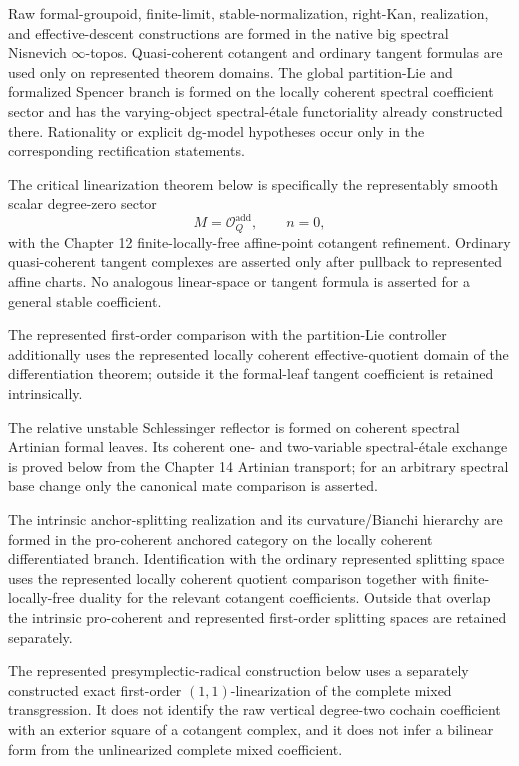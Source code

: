 \begin{convention}
\label{conv:symmetry-noether-theorem-domains}
Raw formal-groupoid, finite-limit, stable-normalization, right-Kan, realization,
and effective-descent constructions are formed in the native big spectral
Nisnevich $\infty$-topos.  Quasi-coherent cotangent and ordinary tangent formulas
are used only on represented theorem domains.  The global partition-Lie and
formalized Spencer branch is formed on the locally coherent spectral coefficient
sector and has the varying-object spectral-\'etale functoriality already
constructed there.  Rationality or explicit dg-model hypotheses occur only in the
corresponding rectification statements.

The critical linearization theorem below is specifically the representably smooth
scalar degree-zero sector
\[
M=\mathcal O_Q^{\mathrm{add}},\qquad n=0,
\]
with the Chapter 12 finite-locally-free affine-point cotangent refinement.  Ordinary
quasi-coherent tangent complexes are asserted only after pullback to represented
affine charts.  No analogous linear-space or tangent formula is asserted for a
general stable coefficient.

The represented first-order comparison with the partition-Lie controller additionally
uses the represented locally coherent effective-quotient domain of the differentiation
theorem; outside it the formal-leaf tangent coefficient is retained intrinsically.

The relative unstable Schlessinger reflector is formed on coherent spectral Artinian
formal leaves.  Its coherent one- and two-variable spectral-\'etale exchange is proved
below from the Chapter 14 Artinian transport; for an arbitrary spectral base change
only the canonical mate comparison is asserted.

The intrinsic anchor-splitting realization and its curvature/Bianchi hierarchy are
formed in the pro-coherent anchored category on the locally coherent differentiated
branch.  Identification with the ordinary represented splitting space uses the
represented locally coherent quotient comparison together with finite-locally-free
duality for the relevant cotangent coefficients.  Outside that overlap the intrinsic
pro-coherent and represented first-order splitting spaces are retained separately.

The represented presymplectic-radical construction below uses a separately
constructed exact first-order $(1,1)$-linearization of the complete mixed
transgression.  It does not identify the raw vertical degree-two cochain coefficient
with an exterior square of a cotangent complex, and it does not infer a bilinear
form from the unlinearized complete mixed coefficient.
\end{convention}

